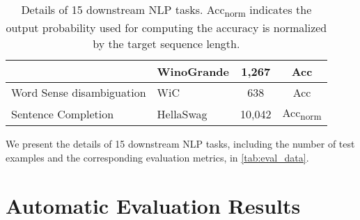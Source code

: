 \documentclass[11pt]{article}
\begin{document}
\begin{table*}[t]
\begin{tabular}{@{}llcc@{}}
                             & WinoGrande \cite{DBLP:conf/aaai/SakaguchiBBC20}                  & \phantom{0}1,267 & Acc                     \\ \midrule
Word Sense disambiguation    & WiC \cite{pilehvar-camacho-collados-2019-wic}                         & \phantom{00}638  & Acc                     \\ \midrule
Sentence Completion          & HellaSwag \cite{zellers-etal-2019-hellaswag}                  & 10,042           & Acc\textsubscript{norm} \\ \bottomrule
\end{tabular}
\caption{
 Details of 15 downstream NLP tasks.
 Acc\textsubscript{norm} indicates the output probability used for computing the accuracy is normalized by the target sequence length.
}
\label{tab:eval_data}
\end{table*} We present the details of 15 downstream NLP tasks, including the number of test examples and the corresponding evaluation metrics, in \autoref{tab:eval_data}.

\section{Automatic Evaluation Results}
\label{sec:auto_eval_results}
\end{document}
